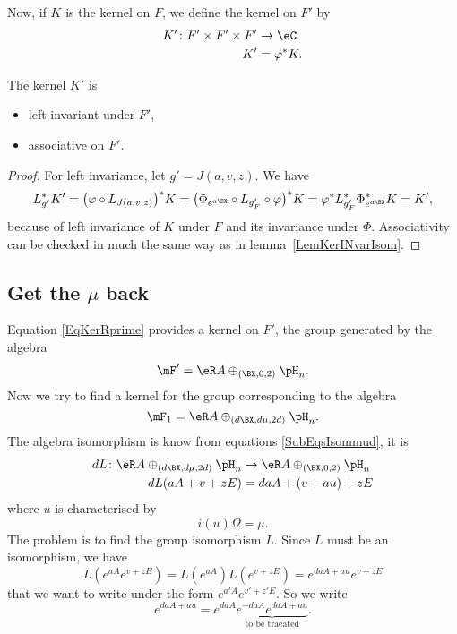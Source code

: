 Now, if $K$ is the kernel on $F$, we define the kernel on $F'$ by
\begin{equation}\label{EqKerRprime}
	\begin{aligned}
		K'\colon F'\times F'\times F' & \to \eC      \\
		K'                            & =\varphi^*K.
	\end{aligned}
\end{equation}


\begin{theorem}
	The kernel $K'$ is
	\begin{itemize}
		\item left invariant under $F'$,
		\item associative on $F'$.
	\end{itemize}
	\label{ThoDefoHeizAvecB}
\end{theorem}
\begin{proof}
	For left invariance, let $g'=J(a,v,z)$. We have
	\[
		L_{g'}^*K'=\big( \varphi\circ L_{J(a,v,z)} \big)^*K=\big( \Phi_{ e^{a\BX}}\circ L_{g'_F}\circ\varphi \big)^*K=\varphi^*L_{g'_F}^*\Phi_{ e^{a\BX}}^*K=K',
	\]
	because of left invariance of $K$ under $F$ and its invariance under $\Phi$. Associativity can be checked in much the same way as in lemma~\ref{LemKerINvarIsom}.
\end{proof}

\subsection{Get the \texorpdfstring{$\mu$}{u} back}  \label{SubSecRemetreMu}

Equation \eqref{EqKerRprime} provides a kernel on $F'$, the group generated by the algebra
\[
	\mF'=\eR A\oplus_{(\BX ,0,2)}\pH_{n}.
\]
Now we try to find a kernel for the group corresponding to the algebra
\[
	\mF_{1}=\eR A\oplus_{(d\BX ,d\mu,2d)}\pH_{n}.
\]
The algebra isomorphism is know from equations \eqref{SubEqsIsommud}, it is
\begin{equation}
	\begin{aligned}
		dL\colon \eR A\oplus_{(d\BX ,d\mu,2d)}\pH_{n} & \to \eR A\oplus_{(\BX ,0,2)}\pH_{n} \\
		dL(aA+v+zE)                                   & =daA+(v+au)+zE
	\end{aligned}
\end{equation}
where $u$ is characterised by
\[
	i(u)\Omega=\mu.
\]
The problem is to find the group isomorphism $L$. Since $L$ must be an isomorphism, we have
\[
	L( e^{aA} e^{v+zE})=L( e^{aA})L( e^{v+zE})
	= e^{daA+au} e^{v+zE}
\]
that we want to write under the form $ e^{a'A} e^{v'+z'E}$. So we write
\[
	e^{daA+au}= e^{daA}\underbrace{e^{-daA} e^{daA+au}}_{\text{to be traeated}}.
\]

